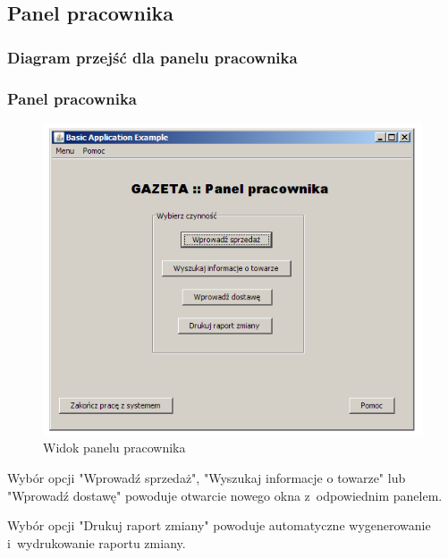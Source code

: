 \subsection{Panel pracownika}
\subsubsection{Diagram przejść dla panelu pracownika}
\subsubsection{Panel pracownika}
\begin{figure}
\includegraphics[width=1\textwidth]{gfx/pracownik.png}
\caption{Widok panelu pracownika}
\end{figure}
Wybór opcji "Wprowadź sprzedaż", "Wyszukaj informacje o towarze" lub "Wprowadź dostawę" powoduje otwarcie nowego okna z~odpowiednim panelem.

Wybór opcji "Drukuj raport zmiany" powoduje automatyczne wygenerowanie i~wydrukowanie raportu zmiany.

